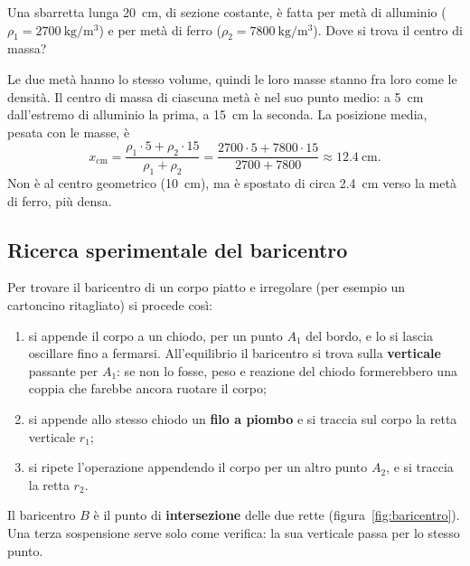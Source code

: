 \begin{testexample}
Una sbarretta lunga \SI{20}{\centi\metre}, di sezione costante, è fatta per metà di alluminio ($\rho_1 = \SI{2700}{\kilo\gram\per\metre\cubed}$) e per metà di ferro ($\rho_2 = \SI{7800}{\kilo\gram\per\metre\cubed}$). Dove si trova il centro di massa?

Le due metà hanno lo stesso volume, quindi le loro masse stanno fra loro come le densità. Il centro di massa di ciascuna metà è nel suo punto medio: a \SI{5}{\centi\metre} dall'estremo di alluminio la prima, a \SI{15}{\centi\metre} la seconda. La posizione media, pesata con le masse, è
\[ x_\text{cm} = \frac{\rho_1 \cdot 5 + \rho_2 \cdot 15}{\rho_1 + \rho_2}
   = \frac{2700 \cdot 5 + 7800 \cdot 15}{2700 + 7800} \approx \SI{12,4}{\centi\metre}. \]
Non è al centro geometrico (\SI{10}{\centi\metre}), ma è spostato di circa \SI{2,4}{\centi\metre} verso la metà di ferro, più densa.
\end{testexample}

\subsection{Ricerca sperimentale del baricentro}
Per trovare il baricentro di un corpo piatto e irregolare (per esempio un cartoncino ritagliato) si procede così:
\begin{enumerate}
\item si appende il corpo a un chiodo, per un punto $A_1$ del bordo, e lo si lascia oscillare fino a fermarsi. All'equilibrio il baricentro si trova sulla \textbf{verticale} passante per $A_1$: se non lo fosse, peso e reazione del chiodo formerebbero una coppia che farebbe ancora ruotare il corpo;
\item si appende allo stesso chiodo un \textbf{filo a piombo} e si traccia sul corpo la retta verticale $r_1$;
\item si ripete l'operazione appendendo il corpo per un altro punto $A_2$, e si traccia la retta $r_2$.
\end{enumerate}
Il baricentro $B$ è il punto di \textbf{intersezione} delle due rette (figura~\ref{fig:baricentro}). Una terza sospensione serve solo come verifica: la sua verticale passa per lo stesso punto.

